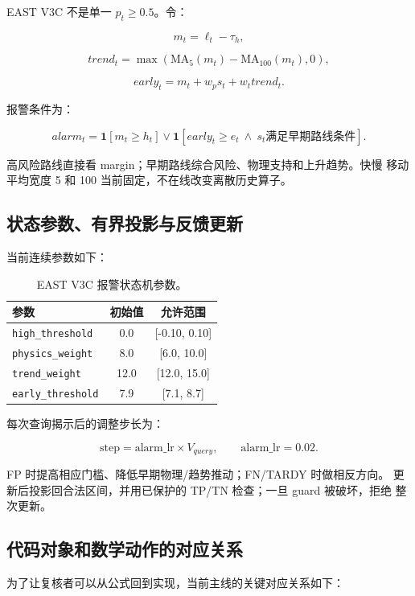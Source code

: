 \documentclass[11pt,a4paper]{article}
\newcommand{\code}[1]{\texttt{\small #1}}
\begin{document}
EAST V3C 不是单一 \(p_t\geq0.5\)。令：

\[
m_t=\ell_t-\tau_h,
\]

\[
trend_t=\max\left(
\mathrm{MA}_5(m_t)-\mathrm{MA}_{100}(m_t),0
\right),
\]

\[
early_t=m_t+w_ps_t+w_ttrend_t.
\]

报警条件为：

\[
alarm_t=
\mathbf{1}[m_t\geq h_t]
\lor
\mathbf{1}[early_t\geq e_t\ \land\ s_t
\text{满足早期路线条件}].
\]

高风险路线直接看 margin；早期路线综合风险、物理支持和上升趋势。快慢
移动平均宽度 5 和 100 当前固定，不在线改变离散历史算子。

\subsection{状态参数、有界投影与反馈更新}

当前连续参数如下：

\begin{table}[H]
\centering
\caption{EAST V3C 报警状态机参数。}
\begin{tabular}{l c c}
\toprule
参数 & 初始值 & 允许范围\\
\midrule
\code{high\_threshold} & 0.0 & [-0.10, 0.10]\\
\code{physics\_weight} & 8.0 & [6.0, 10.0]\\
\code{trend\_weight} & 12.0 & [12.0, 15.0]\\
\code{early\_threshold} & 7.9 & [7.1, 8.7]\\
\bottomrule
\end{tabular}
\end{table}

每次查询揭示后的调整步长为：

\[
\mathrm{step}
=\mathrm{alarm\_lr}\times V_{query},
\qquad \mathrm{alarm\_lr}=0.02.
\]

FP 时提高相应门槛、降低早期物理/趋势推动；FN/TARDY 时做相反方向。
更新后投影回合法区间，并用已保护的 TP/TN 检查；一旦 guard 被破坏，拒绝
整次更新。

\subsection{代码对象和数学动作的对应关系}

为了让复核者可以从公式回到实现，当前主线的关键对应关系如下：
\end{document}
